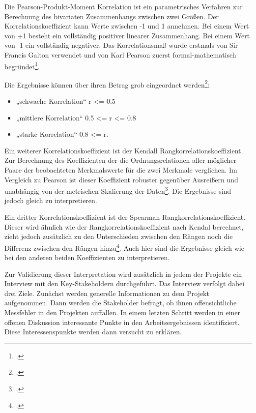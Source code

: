 Die Pearson-Produkt-Moment Korrelation ist ein parametrisches Verfahren
zur Berechnung des bivariaten Zusammenhangs zwischen zwei Größen. Der
Korrelationskoeffizient kann Werte zwischen -1 und 1 annehmen. Bei einem
Wert von +1 besteht ein vollständig positiver linearer Zusammenhang. Bei
einem Wert von -1 ein vollständig negativer. Das Korrelationsmaß wurde
erstmals von Sir Francis Galton verwendet und von Karl Pearson zuerst
formal-mathematisch begründet\footcite[Vgl. ][S. 116]{brucklerGeschichteMathematikKompakt2018}.

Die Ergebnisse können über ihren Betrag grob eingeordnet
werden\footcite[Vgl. ][S. 130]{fahrmeirStatistikWegZur2016}:

\begin{itemize}
\item
    „schwache Korrelation`` r <= 0.5
\item
    „mittlere Korrelation`` 0.5 <= r <= 0.8
\item
    „starke Korrelation`` 0.8 <= r.
\end{itemize}

Ein weiterer Korrelationskoeffizient ist der Kendall
Rangkorrelationskoeffizient. Zur Berechnung des Koeffizienten der die
Ordnungsrelationen aller möglicher Paare der beobachteten Merkmalswerte
für die zwei Merkmale verglichen. Im Vergleich zu Pearson ist dieser
Koeffizient robuster gegenüber Ausreißern und unabhängig von der
metrischen Skalierung der Daten\footcite[Vgl. ][S. 137ff]{fahrmeirStatistikWegZur2016}. Die Ergebnisse sind jedoch gleich zu interpretieren.

Ein dritter Korrelationskoeffizient ist der Spearman
Rangkorrelationskoeffizient. Dieser wird ähnlich wie der
Rangkorrelationskoeffizient nach Kendal berechnet, zieht jedoch
zusätzlich zu den Unterschieden zwischen den Rängen noch die Differenz
zwischen den Rängen hinzu\footcite[Vgl. ][S. 133f]{fahrmeirStatistikWegZur2016}.
Auch hier sind die Ergebnisse gleich wie bei den anderen beiden
Koeffizienten zu interpretieren.

Zur Validierung dieser Interpretation wird zusätzlich in jedem der
Projekte ein Interview mit den Key-Stakeholdern durchgeführt. Das
Interview verfolgt dabei drei Ziele. Zunächst werden generelle
Informationen zu dem Projekt aufgenommen. Dann werden die Stakeholder
befragt, ob ihnen offensichtliche Messfehler in den Projekten auffallen.
In einem letzten Schritt werden in einer offenen Diskussion interessante
Punkte in den Arbeitsergebnissen identifiziert. Diese Interessenspunkte
werden dann versucht zu erklären.

